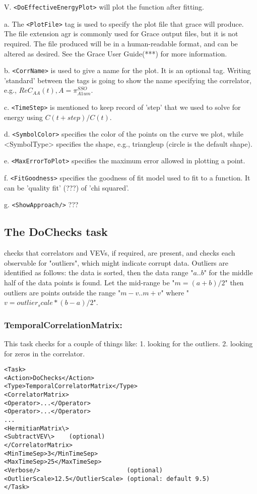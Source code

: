 \documentclass[12pt]{article}
\newcommand{\vb}{\texttt}
\begin{document}
V. \vb{<DoEffectiveEnergyPlot>} will plot the function after fitting.

a. The \vb{<PlotFile>} tag is used to specify the plot file that grace will produce. The file extension agr is commonly used for Grace output files, but it is not required. The file produced will be in a human-readable format, and can be altered as desired. See the Grace User Guide(***) for more information.

b. \vb{<CorrName>} is used to give a name for the plot. It is an optional tag. Writing 'standard' between the tags is going to show the name specifying the correlator, e.g., $Re C_{AA}(t), A = \pi_{A1um}^{SSO}$.

c. \vb{<TimeStep>} is mentioned to keep record of 'step' that we used to solve for energy using $C(t+step)/C(t)$.

d. \vb{<SymbolColor>} specifies the color of the points on the curve we plot, while <SymbolType> specifies the shape, e.g., triangleup (circle is the default shape).

e. \vb{<MaxErrorToPlot>} specifies the maximum error allowed in plotting a point.

f. \vb{<FitGoodness>} specifies the goodness of fit model used to fit to a function. It can be 'quality fit' (???) of 'chi squared'. 

g. \vb{<ShowApproach/>} ??? 

\subsection{The DoChecks task}
checks that correlators and VEVs, if required, are present, and checks each observable for "outliers", which might indicate corrupt data.  Outliers are identified as follows: the data is sorted, then the data range "$a..b$" for the middle half of the data points is found.  Let the mid-range be "$m=(a+b)/2$" then outliers are points outside the range  "$m-v .. m+v$"  where "$v = outlier_scale * (b-a)/2$".      

\subsubsection{TemporalCorrelationMatrix:}
This task checks for a couple of things like:
1. looking for the outliers.
2. looking for zeros in the correlator.
\begin{verbatim}
<Task>
<Action>DoChecks</Action>
<Type>TemporalCorrelatorMatrix</Type>
<CorrelatorMatrix>
<Operator>...</Operator>
<Operator>...</Operator>
...
<HermitianMatrix\>
<SubtractVEV\>    (optional)
</CorrelatorMatrix>
<MinTimeSep>3</MinTimeSep>
<MaxTimeSep>25</MaxTimeSep>
<Verbose/>                        (optional)
<OutlierScale>12.5</OutlierScale> (optional: default 9.5)
</Task>  
\end{verbatim}
    
\end{document}

